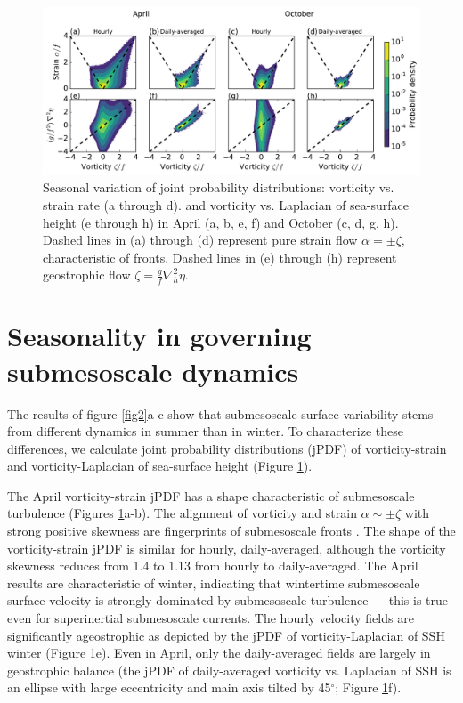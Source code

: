 \documentclass[grl]{agutex2015}
\begin{document}
\begin{article}
\begin{figure}[ht]
  \begin{center}
    \includegraphics[width=.95\textwidth]{figs/fig3.pdf}
 \caption{Seasonal variation of joint probability distributions:  vorticity vs. strain rate (a through d).
          and vorticity vs. Laplacian of sea-surface height (e through h) in April (a, b,
          e, f) and October (c, d, g, h).
          Dashed lines in (a) through (d) represent pure strain flow $\alpha = \pm\zeta$,
          characteristic of fronts. Dashed lines in (e) through
          (h) represent geostrophic flow $\zeta = \frac{g}{f}\nabla_h^2 \eta$.}
 \label{fig3}
 \end{center}
\end{figure}

\section{Seasonality in governing submesoscale dynamics}
The results of figure \ref{fig2}a-c show that submesoscale surface
 variability stems from different dynamics in summer than in winter.
 To characterize these differences, we calculate
joint probability distributions (jPDF) of
vorticity-strain and vorticity-Laplacian of sea-surface height (Figure \ref{fig3}).

The April vorticity-strain jPDF has a shape characteristic of submesoscale turbulence
 (Figures \ref{fig3}a-b). The alignment of vorticity and strain $\alpha \sim \pm\zeta$
 with strong positive skewness are fingerprints of submesoscale fronts
 \citep{shcherbina_etal2013,mcwilliams2016}. The shape of the vorticity-strain
 jPDF is similar for hourly, daily-averaged, although
 the vorticity skewness reduces from 1.4 to 1.13 from hourly to daily-averaged.
 The April results are characteristic of winter, indicating that wintertime submesoscale
 surface velocity is strongly dominated by submesoscale turbulence --- this is true even for
 superinertial submesoscale currents. The hourly velocity fields are significantly
ageostrophic as depicted by the jPDF of vorticity-Laplacian of SSH
winter (Figure \ref{fig3}e). Even in April, only the daily-averaged fields
are largely
in  geostrophic balance (the jPDF of daily-averaged vorticity vs. Laplacian of SSH
is an ellipse with large eccentricity and main axis tilted by 45$^\circ$; Figure \ref{fig3}f).


\end{article}
\end{document}

